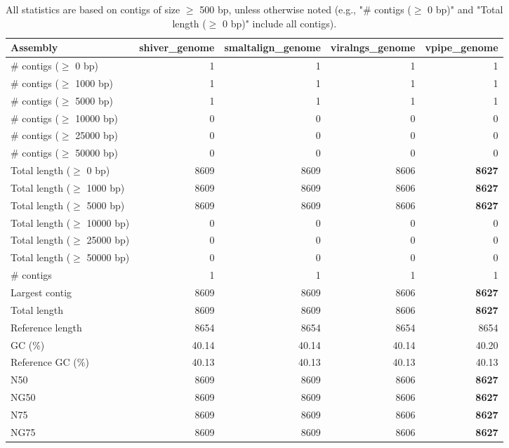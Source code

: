 \documentclass[12pt,a4paper]{article}
\begin{document}
\begin{table}[ht]
\begin{center}
\caption{All statistics are based on contigs of size $\geq$ 500 bp, unless otherwise noted (e.g., "\# contigs ($\geq$ 0 bp)" and "Total length ($\geq$ 0 bp)" include all contigs).}
\begin{tabular}{|l*{4}{|r}|}
\hline
Assembly & shiver\_genome & smaltalign\_genome & viralngs\_genome & vpipe\_genome \\ \hline
\# contigs ($\geq$ 0 bp) & 1 & 1 & 1 & 1 \\ \hline
\# contigs ($\geq$ 1000 bp) & 1 & 1 & 1 & 1 \\ \hline
\# contigs ($\geq$ 5000 bp) & 1 & 1 & 1 & 1 \\ \hline
\# contigs ($\geq$ 10000 bp) & 0 & 0 & 0 & 0 \\ \hline
\# contigs ($\geq$ 25000 bp) & 0 & 0 & 0 & 0 \\ \hline
\# contigs ($\geq$ 50000 bp) & 0 & 0 & 0 & 0 \\ \hline
Total length ($\geq$ 0 bp) & 8609 & 8609 & 8606 & {\bf 8627} \\ \hline
Total length ($\geq$ 1000 bp) & 8609 & 8609 & 8606 & {\bf 8627} \\ \hline
Total length ($\geq$ 5000 bp) & 8609 & 8609 & 8606 & {\bf 8627} \\ \hline
Total length ($\geq$ 10000 bp) & 0 & 0 & 0 & 0 \\ \hline
Total length ($\geq$ 25000 bp) & 0 & 0 & 0 & 0 \\ \hline
Total length ($\geq$ 50000 bp) & 0 & 0 & 0 & 0 \\ \hline
\# contigs & 1 & 1 & 1 & 1 \\ \hline
Largest contig & 8609 & 8609 & 8606 & {\bf 8627} \\ \hline
Total length & 8609 & 8609 & 8606 & {\bf 8627} \\ \hline
Reference length & 8654 & 8654 & 8654 & 8654 \\ \hline
GC (\%) & 40.14 & 40.14 & 40.14 & 40.20 \\ \hline
Reference GC (\%) & 40.13 & 40.13 & 40.13 & 40.13 \\ \hline
N50 & 8609 & 8609 & 8606 & {\bf 8627} \\ \hline
NG50 & 8609 & 8609 & 8606 & {\bf 8627} \\ \hline
N75 & 8609 & 8609 & 8606 & {\bf 8627} \\ \hline
NG75 & 8609 & 8609 & 8606 & {\bf 8627} \\ \hline

\end{tabular}
\end{center}
\end{table}
\end{document}
